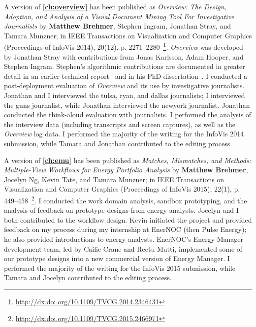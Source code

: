 A version of {\bf \autoref{ch:overview}} has been published as {\it Overview: The Design, Adoption, and Analysis of a Visual Document Mining Tool For Investigative Journalists} by {\bf Matthew Brehmer}, Stephen Ingram, Jonathan Stray, and Tamara Munzner; in IEEE Transactions on Visualization and Computer Graphics (Proceedings of InfoVis 2014), 20(12), p. 2271--2280~\cite{Brehmer2014}\footnote{\url{http://dx.doi.org/10.1109/TVCG.2014.2346431}}. 
{\it Overview} was developed by Jonathan Stray with contributions from Jonas Karlsson, Adam Hooper, and Stephen Ingram. 
Stephen's algorithmic contributions are documented in greater detail in an earlier technical report~\cite{Ingram2012} and in his PhD dissertation~\cite{Ingram2013}.
I conducted a post-deployment evaluation of {\it Overview} and its use by investigative journalists. Jonathan and I interviewed the {\sc tulsa}, {\sc ryan}, and {\sc dallas} journalists; I interviewed the {\sc guns} journalist, while Jonathan interviewed the {\sc newyork} journalist. 
Jonathan conducted the think-aloud evaluation with journalists.
I performed the analysis of the interview data (including transcripts and screen captures), as well as the {\it Overview} log data.
I performed the majority of the writing for the InfoVis 2014 submission, while Tamara and Jonathan contributed to the editing process.

A version of {\bf \autoref{ch:emu}} has been published as {\it Matches, Mismatches, and Methods: Multiple-View Workflows for Energy Portfolio Analysis} by {\bf Matthew Brehmer}, Jocelyn Ng, Kevin Tate, and Tamara Munzner; in IEEE Transactions on Visualization and Computer Graphics (Proceedings of InfoVis 2015), 22(1), p. 449--458~\cite{Brehmer2015}\footnote{\url{http://dx.doi.org/10.1109/TVCG.2015.2466971}}.
I conducted the work domain analysis, sandbox prototyping, and the analysis of feedback on prototype designs from energy analysts. 
Jocelyn and I both contributed to the workflow design.
Kevin initiated the project and provided feedback on my process during my internship at EnerNOC (then Pulse Energy); he also provided introductions to energy analysts.
EnerNOC's Energy Manager development team, led by Cailie Crane and Reetu Mutti, implemented some of our prototype designs into a new commercial version of Energy Manager.
I performed the majority of the writing for the InfoVis 2015 submission, while Tamara and Jocelyn contributed to the editing process.

